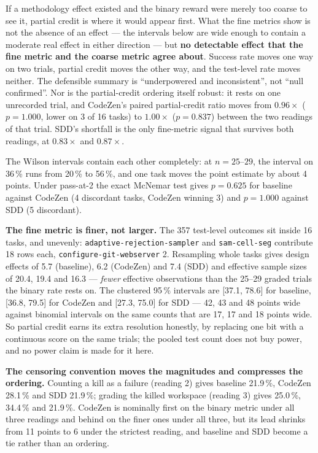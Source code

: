 \documentclass[11pt,a4paper]{article}
\newcommand{\task}[1]{\texttt{\footnotesize #1}}
\begin{document}
If a methodology effect existed and the binary reward were merely too coarse to see it,
partial credit is where it would appear first. What the fine metrics show is not the absence
of an effect --- the intervals below are wide enough to contain a moderate real effect in
either direction --- but \textbf{no detectable effect that the fine metric and the coarse
metric agree about}. Success rate moves one way on two trials, partial credit moves the other
way, and the test-level rate moves neither. The defensible summary is ``underpowered and
inconsistent'', not ``null confirmed''. Nor is the partial-credit ordering itself robust: it
rests on one unrecorded trial, and CodeZen's paired partial-credit ratio moves from
$0.96\times$ ($p = 1.000$, lower on 3 of 16 tasks) to $1.00\times$ ($p = 0.837$) between the
two readings of that trial. SDD's shortfall is the only fine-metric signal that survives both
readings, at $0.83\times$ and $0.87\times$.

The Wilson intervals contain each other completely: at $n = 25$--$29$, the interval on 36\,\%
runs from 20\,\% to 56\,\%, and one task moves the point estimate by about 4 points. Under
pass-at-2 the exact McNemar test gives $p = 0.625$ for baseline against CodeZen (4 discordant
tasks, CodeZen winning 3) and $p = 1.000$ against SDD (5 discordant).

\textbf{The fine metric is finer, not larger.} The 357 test-level outcomes sit inside 16
tasks, and unevenly: \task{adaptive-rejection-sampler} and \task{sam-cell-seg} contribute 18
rows each, \task{configure-git-webserver} 2. Resampling whole tasks gives design effects of
5.7 (baseline), 6.2 (CodeZen) and 7.4 (SDD) and effective sample sizes of 20.4, 19.4 and 16.3
--- \emph{fewer} effective observations than the 25--29 graded trials the binary rate rests
on. The clustered 95\,\% intervals are [37.1, 78.6] for baseline, [36.8, 79.5] for CodeZen and
[27.3, 75.0] for SDD --- 42, 43 and 48 points wide against binomial intervals on the same
counts that are 17, 17 and 18 points wide. So partial credit
earns its extra resolution honestly, by replacing one bit with a continuous score on the same
trials; the pooled test count does not buy power, and no power claim is made for it here.

\textbf{The censoring convention moves the magnitudes and compresses the ordering.} Counting a
kill as a failure (reading 2) gives baseline 21.9\,\%, CodeZen 28.1\,\% and SDD 21.9\,\%;
grading the killed workspace (reading 3) gives 25.0\,\%, 34.4\,\% and 21.9\,\%. CodeZen is
nominally first on the binary metric under all three readings and behind on the finer ones
under all three, but its lead shrinks from 11 points to 6 under the strictest reading, and
baseline and SDD become a tie rather than an ordering.
\end{document}
